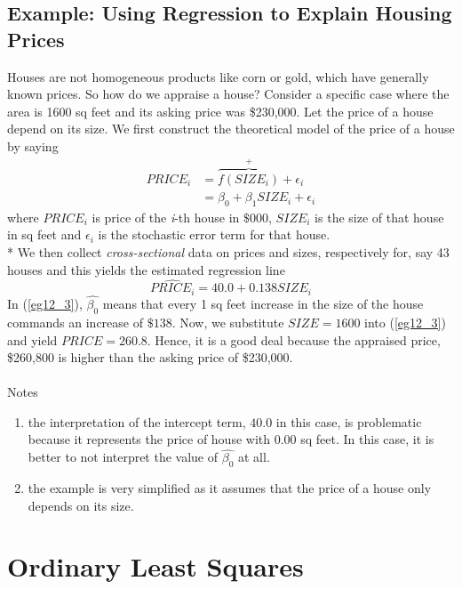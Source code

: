 \documentclass[11pt]{article}
\begin{document}
\subsection{Example: Using Regression to Explain Housing Prices}
Houses are not homogeneous products like corn or gold, which have generally known prices. So how do we appraise a house? Consider a specific case where the area is 1600 sq feet and its asking price was \$230,000. Let the price of a house depend on its size. We first construct the theoretical model of the price of a house by saying
\begin{equation}\label{eg1_22}
\begin{split}
PRICE_i &= \overbrace{f(SIZE_i)}^\text{+}  + \epsilon_i \\&=\beta_0+ \beta_1 SIZE_i + \epsilon_i 
\end{split}
\end{equation}
where $PRICE_i$ is price of the \textit{i}-th house in $\$000$, $SIZE_i$ is the size of that house in sq feet and $\epsilon_i$ is the stochastic error term for that house.\\*
We then collect \textit{cross-sectional} data on prices and sizes, respectively for, say 43 houses and this yields the estimated regression line
\begin{equation}
\hat{PRICE_i} = 40.0 + 0.138SIZE_i \label{eg1_23}
\end{equation}
In (\ref{eg12_3}), $\hat{\beta_0}$ means that every 1 sq feet increase in the size of the house commands an increase of $\$138$. Now, we substitute $SIZE=1600$ into (\ref{eg12_3}) and yield $PRICE=260.8$. Hence, it is a good deal because the appraised price, \$260,800 is higher than the asking price of \$230,000. \\\\Notes
\begin{enumerate}
\item the interpretation of the intercept term, $40.0$ in this case, is problematic because it represents the price of house with 0.00 sq feet. In this case, it is better to not interpret the value of $\hat{\beta_0}$ at all.
\item the example is very simplified as it assumes that the price of a house only depends on its size.
\end{enumerate}
\clearpage
\section{Ordinary Least Squares}
\end{document}
